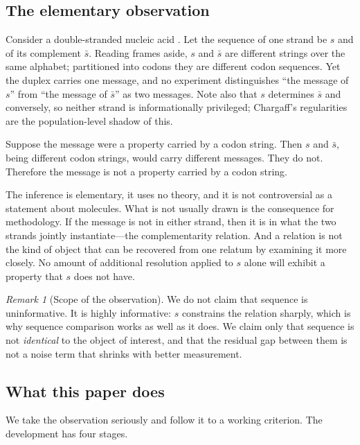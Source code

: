 \documentclass[11pt,twocolumn,a4paper]{article}
\theoremstyle{definition}
\theoremstyle{remark}
\newtheorem{remark}[theorem]{Remark}
\begin{document}
\subsection{The elementary observation}

Consider a double-stranded nucleic acid \citep{watson1953}. Let the
sequence of one strand be $s$ and of its complement $\bar{s}$. Reading
frames aside, $s$ and $\bar{s}$ are different strings over the same
alphabet; partitioned into codons they are different codon sequences. Yet
the duplex carries one message, and no experiment distinguishes ``the
message of $s$'' from ``the message of $\bar{s}$'' as two messages. Note
also that $s$ determines $\bar{s}$ and conversely, so neither strand is
informationally privileged; Chargaff's regularities \citep{chargaff1950}
are the population-level shadow of this.

Suppose the message were a property carried by a codon string. Then $s$
and $\bar{s}$, being different codon strings, would carry different
messages. They do not. Therefore the message is not a property carried by
a codon string.

The inference is elementary, it uses no theory, and it is not
controversial as a statement about molecules. What is not usually drawn is
the consequence for methodology. If the message is not in either strand,
then it is in what the two strands jointly instantiate---the
complementarity relation. And a relation is not the kind of object that
can be recovered from one relatum by examining it more closely. No amount
of additional resolution applied to $s$ alone will exhibit a property that
$s$ does not have.

\begin{remark}[Scope of the observation]
\label{rem:scope}
We do not claim that sequence is uninformative. It is highly informative:
$s$ constrains the relation sharply, which is why sequence comparison works
as well as it does. We claim only that sequence is not \emph{identical} to
the object of interest, and that the residual gap between them is not a
noise term that shrinks with better measurement.
\end{remark}

\subsection{What this paper does}

We take the observation seriously and follow it to a working criterion.
The development has four stages.
\end{document}
